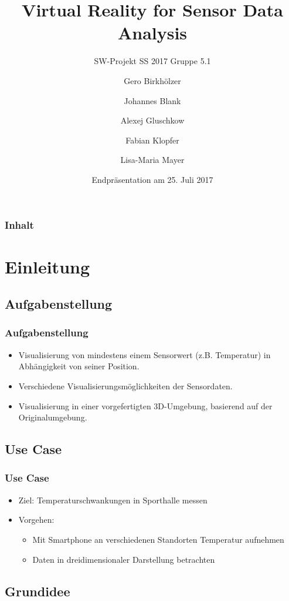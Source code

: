 \documentclass{beamer}
\title{Virtual Reality for Sensor Data Analysis}
\subtitle{SW-Projekt SS 2017 Gruppe 5.1}
\author{Gero Birkhölzer \and Johannes Blank \and Alexej Gluschkow \\ \and Fabian Klopfer \and Lisa-Maria Mayer}
\date{Endpräsentation am 25. Juli 2017}
\begin{document}
\frame{\titlepage}



\begin{frame}
  \frametitle{Inhalt}
  \tableofcontents%
\end{frame}


\section{Einleitung}

\subsection{Aufgabenstellung}

\begin{frame}
\frametitle{Aufgabenstellung}
\begin{itemize}
	\item Visualisierung von mindestens einem Sensorwert (z.B. Temperatur) in Abh\"angigkeit von seiner Position.
	\item Verschiedene Visualisierungsm\"oglichkeiten der Sensordaten.
	\item Visualisierung in einer vorgefertigten 3D-Umgebung, basierend auf der Originalumgebung.
\end{itemize}
\end{frame}

\subsection{Use Case}

\begin{frame}
\frametitle{Use Case}
\begin{itemize}
	\item Ziel: Temperaturschwankungen in Sporthalle messen
	\item Vorgehen: \begin{itemize}
		\item Mit Smartphone an verschiedenen Standorten Temperatur aufnehmen
		\item Daten in dreidimensionaler Darstellung betrachten
	\end{itemize}
		
\end{itemize}
\end{frame}


\subsection{Grundidee} %
\end{document}
